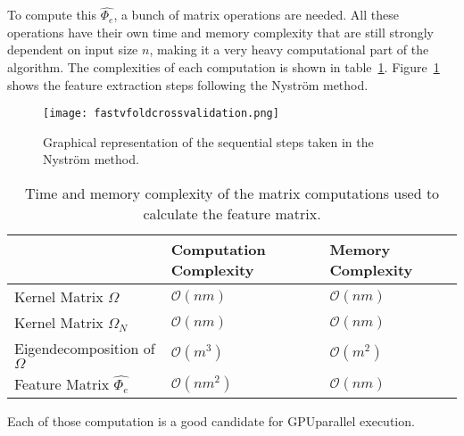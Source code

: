 To compute this $\hat{\Phi_e}$, a bunch of matrix operations are needed.
All these operations have their own time and memory complexity that are still strongly dependent on input size $n$, making it a very heavy computational part of the algorithm.
The complexities of each computation is shown in table~\ref{tab:featurescomplexity}.
Figure~\ref{fig:nystrom} shows the feature extraction steps following the Nystr\"om method.
\begin{figure}
	\centering
	\texttt{[image: fastvfoldcrossvalidation.png]}
	\caption{Graphical representation of the sequential steps taken in the Nystr\"om method.}
	\label{fig:nystrom}
\end{figure}
\begin{table}[]
	\centering
	\begin{tabular}{lll}
		& Computation Complexity & Memory Complexity  \\ \hline
		\multicolumn{1}{l|}{Kernel Matrix $\Omega$}         & $\mathcal{O}(nm)$      & $\mathcal{O}(nm)$  \\
		\multicolumn{1}{l|}{Kernel Matrix $\Omega_N$}       & $\mathcal{O}(nm)$      & $\mathcal{O}(nm)$  \\
		\multicolumn{1}{l|}{Eigendecomposition of $\Omega$} & $\mathcal{O}(m^3)$     & $\mathcal{O}(m^2)$ \\
		\multicolumn{1}{l|}{Feature Matrix $\hat{\Phi_e}$}  & $\mathcal{O}(nm^2)$    & $\mathcal{O}(nm)$ 
	\end{tabular}
	\caption{Time and memory complexity of the matrix computations used to calculate the feature matrix.}
	\label{tab:featurescomplexity}
\end{table}
Each of those computation is a good candidate for GPUparallel execution.
